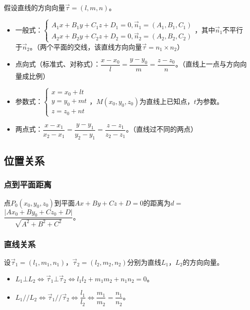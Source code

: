 \documentclass[UTF8, 12pt]{ctexart}
\begin{document}
假设直线的方向向量$\vec{\tau}=(l,m,n)$。

\begin{itemize}
    \item 一般式：$\left\{\begin{array}{l}
        A_1x+B_1y+C_1z+D_1=0,\vec{n}_1=(A_1,B_1,C_1) \\
        A_2x+B_2y+C_2z+D_2=0,\vec{n}_2=(A_2,B_2,C_2)
    \end{array}\right.$，其中$\vec{n}_1$不平行于$\vec{n}_2$。（两个平面的交线，该直线方向向量$\vec{\tau}=n_1\times n_2$）
    \item 点向式（标准式、对称式）：$\dfrac{x-x_0}{l}=\dfrac{y-y_0}{m}=\dfrac{z-z_0}{n}$。（直线上一点与方向向量成比例）
    \item 参数式：$\left\{\begin{array}{l}
        x=x_0+lt \\
        y=y_0+mt \\
        z=z_0+nt
    \end{array}\right.$，$M(x_0,y_0,z_0)$为直线上已知点，$t$为参数。
    \item 两点式：$\dfrac{x-x_1}{x_2-x_1}=\dfrac{y-y_1}{y_2-y_1}=\dfrac{z-z_1}{z_2-z_1}$。（直线过不同的两点）
\end{itemize}

\subsection{位置关系}

\subsubsection{点到平面距离}

点$P_0(x_0,y_0,z_0)$到平面$Ax+By+Cz+D=0$的距离为$d=$\\$\dfrac{\vert Ax_0+By_0+Cz_0+D\vert}{\sqrt{A^2+B^2+C^2}}$。

\subsubsection{直线关系}

设$\vec{\tau}_1=(l_1,m_1,n_1)$，$\vec{\tau}_2=(l_2,m_2,n_2)$分别为直线$L_1$，$L_2$的方向向量。

\begin{itemize}
    \item $L_1\bot L_2\Leftrightarrow\vec{\tau}_1\bot\vec{\tau}_2\Leftrightarrow l_1l_2+m_1m_2+n_1n_2=0$。
    \item $L_1//L_2\Leftrightarrow\vec{\tau}_1//\vec{\tau}_2\Leftrightarrow\dfrac{l_1}{l_2}\Leftrightarrow\dfrac{m_1}{m_2}=\dfrac{n_1}{n_2}$。
\end{itemize}
\end{document}
